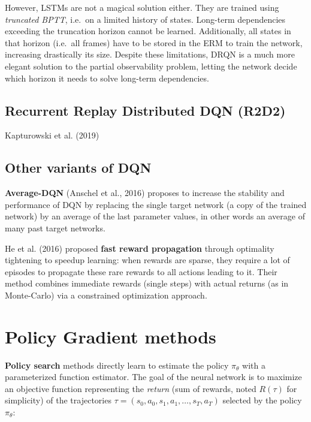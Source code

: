 \documentclass[
  letterpaper,
  DIV=11,
  numbers=noendperiod]{scrreprt}
\begin{document}
However, LSTMs are not a magical solution either. They are trained using
\emph{truncated BPTT}, i.e.~on a limited history of states. Long-term
dependencies exceeding the truncation horizon cannot be learned.
Additionally, all states in that horizon (i.e.~all frames) have to be
stored in the ERM to train the network, increasing drastically its size.
Despite these limitations, DRQN is a much more elegant solution to the
partial observability problem, letting the network decide which horizon
it needs to solve long-term dependencies.

\hypertarget{recurrent-replay-distributed-dqn-r2d2}{%
\section{Recurrent Replay Distributed DQN
(R2D2)}\label{recurrent-replay-distributed-dqn-r2d2}}

Kapturowski et al. (2019)

\hypertarget{other-variants-of-dqn}{%
\section{Other variants of DQN}\label{other-variants-of-dqn}}

\textbf{Average-DQN} (Anschel et al., 2016) proposes to increase the
stability and performance of DQN by replacing the single target network
(a copy of the trained network) by an average of the last parameter
values, in other words an average of many past target networks.

He et al. (2016) proposed \textbf{fast reward propagation} through
optimality tightening to speedup learning: when rewards are sparse, they
require a lot of episodes to propagate these rare rewards to all actions
leading to it. Their method combines immediate rewards (single steps)
with actual returns (as in Monte-Carlo) via a constrained optimization
approach.


\hypertarget{policy-gradient-methods}{%
\chapter{Policy Gradient methods}\label{policy-gradient-methods}}

\textbf{Policy search} methods directly learn to estimate the policy
\(\pi_\theta\) with a parameterized function estimator. The goal of the
neural network is to maximize an objective function representing the
\emph{return} (sum of rewards, noted \(R(\tau)\) for simplicity) of the
trajectories \(\tau = (s_0, a_0, s_1, a_1, \ldots, s_T, a_T)\) selected
by the policy \(\pi_\theta\):
\end{document}
